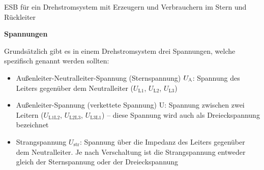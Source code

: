 \begin{frame}
    
    
    \b{
        ESB für ein Drehstromsystem mit Erzeugern und Verbrauchern im Stern und Rückleiter
    }
\end{frame}

\begin{frame}
    
    
    \textbf{Spannungen}
    
    Grundsätzlich gibt es in einem Drehstromsystem drei Spannungen, welche spezifisch genannt werden sollten:
    
    \begin{itemize}
        \item Außenleiter-Neutralleiter-Spannung (Sternspannung) $U_\Stern$: Spannung des Leiters gegenüber dem Neutralleiter ($U_{\mathrm{L1}}$, $U_{\mathrm{L2}}$, $U_{\mathrm{L3}}$)
        \item Außenleiter-Spannung (verkettete Spannung) U: Spannung zwischen zwei Leitern ($U_{\mathrm{L1L2}}$, $U_{\mathrm{L2L3}}$, $U_{\mathrm{L3L1}}$) -- diese Spannung wird auch als Dreieckspannung bezeichnet
        \item Strangspannung $U_{\mathrm{str}}$: Spannung über die Impedanz des Leiters gegenüber dem Neutralleiter. Je nach Verschaltung ist die Strangspannung entweder gleich der Sternspannung oder der Dreieckspannung
    \end{itemize}
    
\end{frame}


